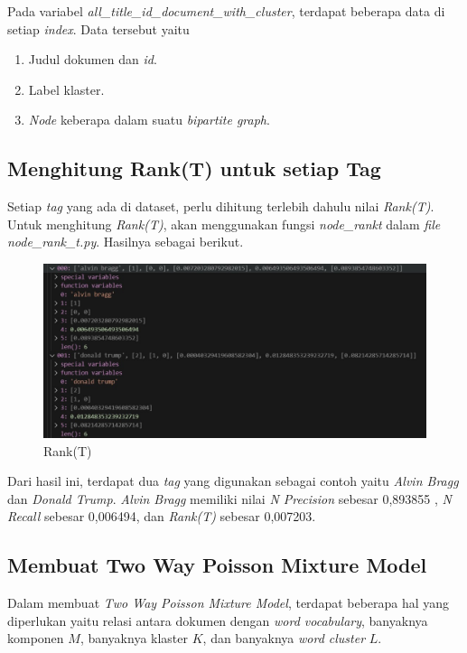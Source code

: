 Pada variabel \textit{all\_title\_id\_document\_with\_cluster}, terdapat beberapa data di setiap \textit{index}.
Data tersebut yaitu
\begin{enumerate}
  \item Judul dokumen dan \textit{id}.
  \item Label klaster.
  \item \textit{Node} keberapa dalam suatu \textit{bipartite graph}.
\end{enumerate}

\subsection{Menghitung Rank(T) untuk setiap Tag}

Setiap \textit{tag} yang ada di dataset, perlu dihitung terlebih dahulu nilai
\textit{Rank(T)}. Untuk menghitung \textit{Rank(T)}, akan menggunakan fungsi
\textit{node\_rankt} dalam \textit{file} \textit{node\_rank\_t.py}. Hasilnya
sebagai berikut.


\begin{figure}[H]
  \centering
  \includegraphics[width=1\textwidth]{gambar/bab_4_image/Node Rank T.jpg}
  \caption{Rank(T)}
  \label{gambar:rankT}
\end{figure}

Dari hasil ini, terdapat dua \textit{tag} yang digunakan sebagai contoh yaitu 
\textit{Alvin Bragg} dan \textit{Donald Trump}. \textit{Alvin Bragg} memiliki nilai 
\textit{N Precision} sebesar 0,893855 , \textit{N Recall} sebesar 0,006494, dan
\textit{Rank(T)} sebesar 0,007203. 

\subsection{Membuat Two Way Poisson Mixture Model}

Dalam membuat \textit{Two Way Poisson Mixture Model}, terdapat beberapa hal yang
diperlukan yaitu relasi antara dokumen dengan \textit{word vocabulary},
banyaknya komponen $M$, banyaknya klaster $K$, dan banyaknya 
\textit{word cluster} $L$.

